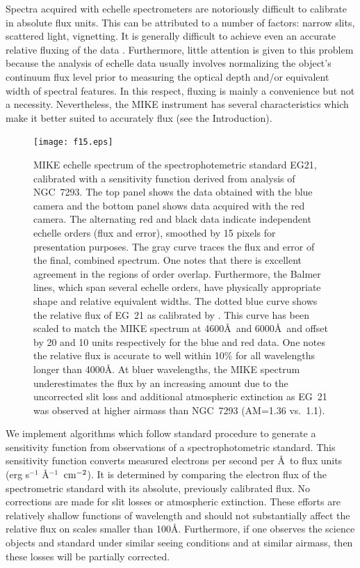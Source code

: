 \documentclass[]{emulateapj}
\begin{document}
Spectra acquired with echelle spectrometers are notoriously
difficult to calibrate in absolute flux units.
This can be attributed to a number of factors:  narrow slits,
scattered light, vignetting.
It is generally difficult to achieve even
an accurate relative fluxing of the data \citep[e.g.][]{dh,elp+99,suzuki}.
Furthermore, little attention is given to this problem
because the analysis of echelle data usually involves
normalizing the object's continuum flux level prior
to measuring the optical depth and/or equivalent width of spectral
features.  In this respect, fluxing is mainly a convenience but
not a necessity.  Nevertheless, the MIKE instrument has several
characteristics which make it better suited to accurately flux (see the
Introduction). 



\begin{figure}
\texttt{[image: f15.eps]}
\caption{MIKE echelle spectrum of the spectrophotemetric
standard EG21, calibrated with a sensitivity function derived
from analysis of NGC~7293.  The top panel shows the data
obtained with the blue camera and the bottom panel shows data
acquired with the red camera.  
The alternating red and black data
indicate independent echelle orders (flux and error), 
smoothed by 15 pixels for presentation purposes.  The gray curve 
traces the flux and error of the final, combined spectrum.
One notes that there is excellent agreement in the regions of
order overlap.  Furthermore, the Balmer lines, which span 
several echelle orders, have physically appropriate shape
and relative equivalent widths.
The dotted blue curve shows the relative flux of EG~21 as
calibrated by \cite{hamuy94}.  This curve
has been scaled to match the MIKE spectrum at 4600\AA\
and 6000\AA\ and offset by 20 and 10 units respectively for the
blue and red data.  One notes the relative flux is accurate to
well within 10$\%$ for all wavelengths longer than 4000\AA.
At bluer wavelengths, the MIKE spectrum underestimates the flux
by an increasing amount due to the uncorrected slit loss and 
additional atmospheric extinction as EG~21 was observed at
higher airmass than NGC~7293 (AM=1.36 vs.\ 1.1).
}
\label{fig:eg21}
\end{figure}


We implement algorithms which follow standard procedure to 
generate a sensitivity function from observations of a spectrophotometric
standard.  This sensitivity function converts measured electrons per
second per \AA\ to flux units (erg s$^{-1}$ \AA$^{-1}$ $\, {\rm cm^{-2}}$).
It is determined by comparing the electron flux of the spectrometric
standard with its absolute, previously calibrated flux.
No corrections are made for slit losses or atmospheric extinction.
These efforts are relatively shallow functions of wavelength and should
not substantially affect the relative flux on scales smaller than 100\AA.
Furthermore,
if one observes the science objects and standard under similar seeing
conditions and at similar airmass, then these losses will be 
partially corrected.
\end{document}
